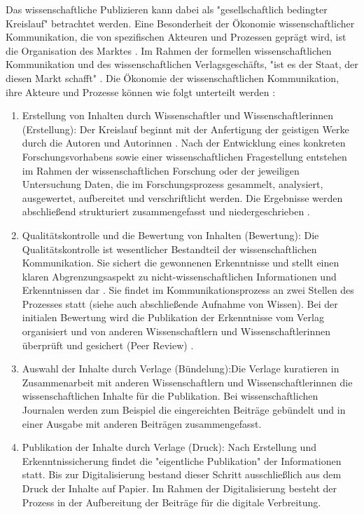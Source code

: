Das wissenschaftliche Publizieren kann dabei als "gesellschaftlich bedingter Kreislauf" \cite{Schirmbacher_2009} betrachtet werden. Eine Besonderheit der Ökonomie wissenschaftlicher Kommunikation, die von spezifischen Akteuren und Prozessen geprägt wird, ist die Organisation des Marktes \cite{Hess_2006}. Im Rahmen der formellen wissenschaftlichen Kommunikation und des wissenschaftlichen Verlagsgeschäfts, "ist es der Staat, der diesen Markt schafft" \cite{Hirschi_2015}. Die Ökonomie der wissenschaftlichen Kommunikation, ihre Akteure und Prozesse können wie folgt unterteilt werden \cite{Hess_2006}:
\begin{enumerate}
\item Erstellung von Inhalten durch Wissenschaftler und Wissenschaftlerinnen (Erstellung): Der Kreislauf beginnt mit der Anfertigung der geistigen Werke durch die Autoren und Autorinnen \cite{Schirmbacher_2009}. Nach der Entwicklung eines konkreten Forschungsvorhabens sowie einer wissenschaftlichen Fragestellung entstehen im Rahmen der wissenschaftlichen Forschung oder der jeweiligen Untersuchung Daten, die im Forschungsprozess gesammelt, analysiert, ausgewertet, aufbereitet und verschriftlicht werden. Die Ergebnisse werden abschließend strukturiert zusammengefasst und niedergeschrieben \cite{Hess_2006}.
\item Qualitätskontrolle und die Bewertung von Inhalten (Bewertung): Die Qualitätskontrolle ist wesentlicher Bestandteil der wissenschaftlichen Kommunikation. Sie sichert die gewonnenen Erkenntnisse und stellt einen klaren Abgrenzungsaspekt zu nicht-wissenschaftlichen Informationen und Erkenntnissen dar \cite{Luhmann_1998}. Sie findet im Kommunikationsprozess an zwei Stellen des Prozesses statt (siehe auch abschließende Aufnahme von Wissen). Bei der initialen Bewertung wird die Publikation der Erkenntnisse vom Verlag organisiert \cite{Schirmbacher_2009} und von anderen Wissenschaftlern und Wissenschaftlerinnen überprüft und gesichert (Peer Review) \cite{Hess_2006}.
\item Auswahl der Inhalte durch Verlage (Bündelung):Die Verlage kuratieren in Zusammenarbeit mit anderen Wissenschaftlern und Wissenschaftlerinnen die wissenschaftlichen Inhalte für die Publikation. Bei wissenschaftlichen Journalen werden zum Beispiel die eingereichten Beiträge gebündelt und in einer Ausgabe mit anderen Beiträgen zusammengefasst.
\item Publikation der Inhalte durch Verlage (Druck): Nach Erstellung und Erkenntnissicherung findet die "eigentliche Publikation" \cite{Schirmbacher_2009} der Informationen statt. Bis zur Digitalisierung bestand dieser Schritt ausschließlich aus dem Druck der Inhalte auf Papier. Im Rahmen der Digitalisierung besteht der Prozess in der Aufbereitung der Beiträge für die digitale Verbreitung.

\end{enumerate}
